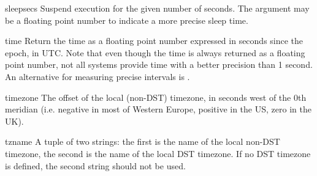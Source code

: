 \begin{funcdesc}{sleep}{secs}
Suspend execution for the given number of seconds.  The argument may
be a floating point number to indicate a more precise sleep time.
\end{funcdesc}

\begin{funcdesc}{time}{}
Return the time as a floating point number expressed in seconds since
the epoch, in UTC.  Note that even though the time is always returned
as a floating point number, not all systems provide time with a better
precision than 1 second.  An alternative for measuring precise
intervals is .
\end{funcdesc}

\begin{datadesc}{timezone}
The offset of the local (non-DST) timezone, in seconds west of the 0th
meridian (i.e. negative in most of Western Europe, positive in the US,
zero in the UK).
\end{datadesc}

\begin{datadesc}{tzname}
A tuple of two strings: the first is the name of the local non-DST
timezone, the second is the name of the local DST timezone.  If no DST
timezone is defined, the second string should not be used.
\end{datadesc}
